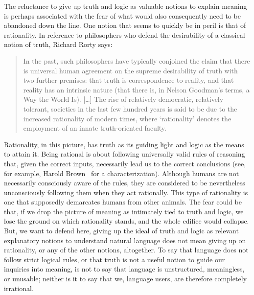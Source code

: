 \documentclass[a4paper]{article}
\begin{document}
The reluctance to give up truth and logic as valuable notions to explain meaning is perhaps associated with the fear of what would also consequently need to be abandoned down the line.
One notion that seems to quickly be in peril is that of rationality.
In reference to philosophers who defend the desirability of a classical notion of truth, Richard Rorty says:
\begin{quote}
In the past, such philosophers have typically conjoined the claim that there is universal human agreement on the supreme desirability of truth with two further premises: that truth is correspondence to reality, and that reality has an intrinsic nature (that there is, in Nelson Goodman's terms, a Way the World Is).
[\ldots]
The rise of relatively democratic, relatively tolerant, societies in the last few hundred years is said to be due to the increased rationality of modern times, where `rationality' denotes the employment of an innate truth-oriented faculty.%
~\parencite*[1]{rorty_response_2000-1}
\end{quote}
Rationality, in this picture, has truth as its guiding light and logic as the means to attain it.
Being rational is about following universally valid rules of reasoning that, given the correct inputs, necessarily lead us to the correct conclusions (see, for example, Harold Brown~\parencite*[19]{brown_rationality_1990} for a characterization).
Although humans are not necessarily consciously aware of the rules, they are considered to be nevertheless unconsciously following them when they act rationally.
This type of rationality is one that supposedly demarcates humans from other animals.
The fear could be that, if we drop the picture of meaning as intimately tied to truth and logic, we lose the ground on which rationality stands, and the whole edifice would collapse.
But, we want to defend here, giving up the ideal of truth and logic as relevant explanatory notions to understand natural language does not mean giving up on rationality, or any of the other notions, altogether.
To say that language does not follow strict logical rules, or that truth is not a useful notion to guide our inquiries into meaning, is not to say that language is unstructured, meaningless, or unusable; neither is it to say that we, language users, are therefore completely irrational.
\end{document}
